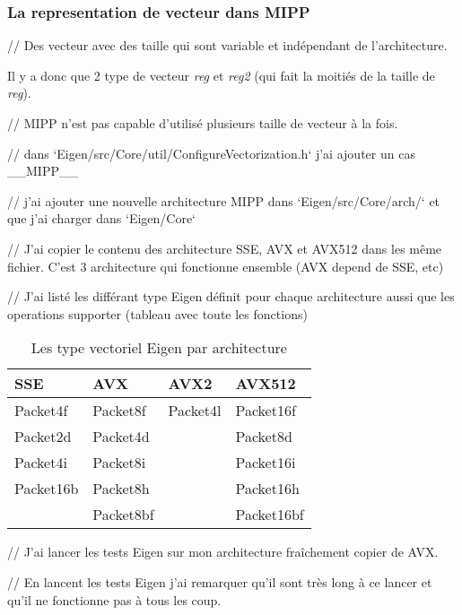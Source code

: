 \subsubsection{La representation de vecteur dans MIPP}
{
  // Des vecteur avec des taille qui sont variable et indépendant de l'architecture.

  Il y a donc que 2 type de vecteur \emph{reg} et \emph{reg2} (qui fait la moitiés de la
  taille de \emph{reg}).

  // MIPP n'est pas capable d'utilisé plusieurs taille de vecteur à la fois.
}



// dans `Eigen/src/Core/util/ConfigureVectorization.h` j'ai ajouter un cas \_\_MIPP\_\_

// j'ai ajouter une nouvelle architecture MIPP dans `Eigen/src/Core/arch/` et que j'ai
charger dans `Eigen/Core`

// J'ai copier le contenu des architecture SSE, AVX et AVX512 dans les même fichier.
C'est 3 architecture qui fonctionne ensemble (AVX depend de SSE, etc)

// J'ai listé les différant type Eigen définit pour chaque architecture aussi que les
operations supporter (tableau avec toute les fonctions)

\begin{table}[H]
  \centering
  \begin{tabular}[H]{|l|l|l|l|}
    \hline
    \textbf{SSE} & \textbf{AVX} & \textbf{AVX2} & \textbf{AVX512} \\
    \hline
    Packet4f     & Packet8f     & Packet4l      & Packet16f       \\
    \hline
    Packet2d     & Packet4d     &               & Packet8d        \\
    \hline
    Packet4i     & Packet8i     &               & Packet16i       \\
    \hline
    Packet16b    & Packet8h     &               & Packet16h       \\
    \hline
                 & Packet8bf    &               & Packet16bf      \\
    \hline
  \end{tabular}
  \caption{Les type vectoriel Eigen par architecture}
\end{table}

// J'ai lancer les tests Eigen sur mon architecture fraîchement copier de AVX.

// En lancent les tests Eigen j'ai remarquer qu'il sont très long à ce lancer et qu'il
ne fonctionne pas à tous les coup.

